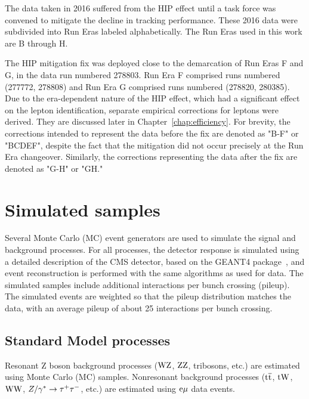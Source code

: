The data taken in 2016 suffered from the HIP effect until a task force was
convened to mitigate the decline in tracking performance.
These 2016 data were subdivided into Run Eras labeled alphabetically.
The Run Eras used in this work are B through H. 

The HIP mitigation fix was deployed close to the demarcation of Run Eras F and G,
in the data run numbered 278803.
Run Era F comprised runs numbered (277772, 278808) and Run Era G comprised runs numbered (278820, 280385).
Due to the era-dependent nature of the HIP effect, which had a significant effect on the lepton identification, 
separate empirical corrections for leptons were derived.
They are discussed later in Chapter~\ref{chap:efficiency}.
For brevity, the corrections intended to represent the data before the fix are denoted as
"B-F" or "BCDEF", despite the fact that the mitigation did not occur precisely at the Run Era changeover.
Similarly, the corrections representing the data after the fix are denoted as "G-H" or "GH." 

\section{Simulated samples}
Several Monte Carlo (MC) event generators are used to simulate the signal and
background processes. For all processes, the detector response is simulated using a detailed
description of the CMS detector, based on the \textsc{GEANT4} 
package~\cite{Agostinelli:2002hh}, and event reconstruction is performed with
the same algorithms as used for data.
The simulated samples include additional interactions per bunch crossing (pileup).
The simulated events are weighted so that the pileup distribution matches the data,
with an average pileup of about 25 interactions per bunch crossing.

\subsection{Standard Model processes}
Resonant Z boson background processes ($\mathrm{W}\mathrm{Z}$, $\mathrm{Z}\mathrm{Z}$, tribosons, etc.) are
estimated using Monte Carlo (MC) samples. Nonresonant background processes
(${\mathrm{t}\overline{\mathrm{t}}}$, $\mathrm{tW}$, $\mathrm{W}\mathrm{W}$, $Z/\gamma^*\to\tau^+\tau^-$, etc.) are estimated using $\mathrm{e}\mu$ data events.

